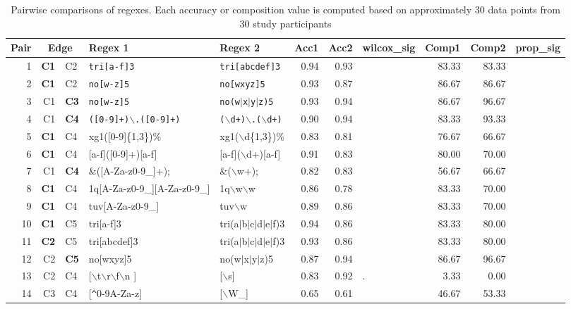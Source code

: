 \begin{table*}[ht]
\centering
\caption{Pairwise comparisons of regexes. Each accuracy or composition value is computed based on approximately 30 data points from 30 study participants}
\begin{tabular}{rr@{ -- }lllrrlrrl}
  \hline
 Pair & \multicolumn{2}{c}{Edge} & Regex 1 & Regex 2 & Acc1 & Acc2 & wilcox\_sig & Comp1 & Comp2 & prop\_sig \\ 
  \hline
1 & {\bf C1} & C2 & {\tt tri[a-f]3} & {\tt tri[abcdef]3} & 0.94 & 0.93 &   & 83.33 & 83.33 &   \\ 
  2 & {\bf C1} & C2 & {\tt no[w-z]5} & {\tt no[wxyz]5} & 0.93 & 0.87 &   & 86.67 & 86.67 &   \\ 
  3 & C1 & {\bf C3} & {\tt no[w-z]5} & {\tt no(w$|$x$|$y$|$z)5} & 0.93 & 0.94 &   & 86.67 & 96.67 &   \\ 
  4 & C1 & {\bf C4} & {\tt ([0-9]+)$\backslash$.([0-9]+)} & {\tt ($\backslash$d+)$\backslash$.($\backslash$d+)} & 0.90 & 0.94 &   & 83.33 & 93.33 &   \\ 
  5 & {\bf C1} & C4 & xg1([0-9]\{1,3\})\% & xg1($\backslash$d\{1,3\})\% & 0.83 & 0.81 &   & 76.67 & 66.67 &   \\ 
  6 & {\bf C1} & C4 & [a-f]([0-9]+)[a-f] & [a-f]($\backslash$d+)[a-f] & 0.91 & 0.83 &   & 80.00 & 70.00 &   \\ 
  7 & C1 & {\bf C4} & \&([A-Za-z0-9\_]+); & \&($\backslash$w+); & 0.82 & 0.83 &   & 56.67 & 66.67 &   \\ 
  8 & {\bf C1} & C4 & 1q[A-Za-z0-9\_][A-Za-z0-9\_] & 1q$\backslash$w$\backslash$w & 0.86 & 0.78 &   & 83.33 & 70.00 &   \\ 
  9 & {\bf C1} & C4 & tuv[A-Za-z0-9\_] & tuv$\backslash$w & 0.89 & 0.86 &   & 83.33 & 70.00 &   \\ 
    10 & {\bf C1} & C5 & tri[a-f]3 & tri(a$|$b$|$c$|$d$|$e$|$f)3 & 0.94 & 0.86 &   & 83.33 & 80.00 &   \\ 
  11 & {\bf C2} & C5 & tri[abcdef]3 & tri(a$|$b$|$c$|$d$|$e$|$f)3 & 0.93 & 0.86 &   & 83.33 & 80.00 &   \\ 
  12 & C2 & {\bf C5} & no[wxyz]5 & no(w$|$x$|$y$|$z)5 & 0.87 & 0.94 &   & 86.67 & 96.67 &   \\ 
  13 & C2 & C4 & [$\backslash$t$\backslash$r$\backslash$f$\backslash$n ] & [$\backslash$s] & 0.83 & 0.92 & . & 3.33 & 0.00 &   \\ 
  14 & C3 & C4 & [\verb|^|0-9A-Za-z] & [$\backslash$W\_] & 0.65 & 0.61 &   & 46.67 & 53.33 &   \\ 

\end{tabular}
\end{table*}
